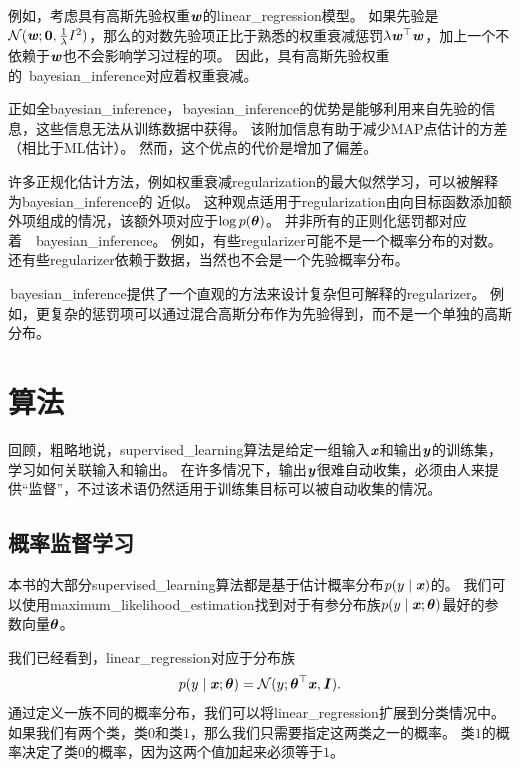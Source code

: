 
例如，考虑具有高斯先验权重$\boldsymbol{\mathit{w}}$的\gls{linear_regression}模型。
如果先验是$\mathcal{N}(\boldsymbol{\mathit{w}};\mathbf{0},\frac{1}{\lambda}I^2)$，那么的对数先验项正比于熟悉的权重衰减惩罚$\lambda \boldsymbol{\mathit{w}}^\top\boldsymbol{\mathit{w}}$，加上一个不依赖于$\boldsymbol{\mathit{w}}$也不会影响学习过程的项。
因此，具有高斯先验权重的~\gls{bayesian_inference}对应着权重衰减。

正如全\gls{bayesian_inference}，\,\gls{bayesian_inference}的优势是能够利用来自先验的信息，这些信息无法从训练数据中获得。
该附加信息有助于减少\gls{MAP}点估计的方差（相比于ML估计）。
然而，这个优点的代价是增加了偏差。

许多正规化估计方法，例如权重衰减\gls{regularization}的最大似然学习，可以被解释为\gls{bayesian_inference}的\,\,近似。
这种观点适用于\gls{regularization}由向目标函数添加额外项组成的情况，该额外项对应于$\log p(\boldsymbol{\theta})$。
并非所有的正则化惩罚都对应着~~\gls{bayesian_inference}。
例如，有些\gls{regularizer}可能不是一个概率分布的对数。
还有些\gls{regularizer}依赖于数据，当然也不会是一个先验概率分布。

\,\gls{bayesian_inference}提供了一个直观的方法来设计复杂但可解释的\gls{regularizer}。
例如，更复杂的惩罚项可以通过混合高斯分布作为先验得到，而不是一个单独的高斯分布\citep{Nowlan-nips92}。

\section{算法}
\label{sec:supervised_learning_algorithms}
回顾，粗略地说，\gls{supervised_learning}算法是给定一组输入$\boldsymbol{\mathit{x}}$和输出$\boldsymbol{\mathit{y}}$的训练集，学习如何关联输入和输出。
在许多情况下，输出$\boldsymbol{\mathit{y}}$很难自动收集，必须由人来提供``监督''，不过该术语仍然适用于训练集目标可以被自动收集的情况。


\subsection{概率监督学习}
\label{sec:probabilistic_supervised_learning}
本书的大部分\gls{supervised_learning}算法都是基于估计概率分布$p(y\mid\boldsymbol{\mathit{x}})$的。
我们可以使用\gls{maximum_likelihood_estimation}找到对于有参分布族$p(y\mid\boldsymbol{\mathit{x}};\boldsymbol{\theta})$最好的参数向量$\boldsymbol{\theta}$。 

我们已经看到，\gls{linear_regression}对应于分布族
\begin{equation}
    p(y \mid \boldsymbol{\mathit{x}}; \boldsymbol{\theta}) = \mathcal{N}( y; \boldsymbol{\theta}^\top \boldsymbol{\mathit{x}}, \boldsymbol{\mathit{I}}).
\end{equation}
通过定义一族不同的概率分布，我们可以将\gls{linear_regression}扩展到分类情况中。
如果我们有两个类，类$0$和类$1$，那么我们只需要指定这两类之一的概率。
类$1$的概率决定了类$0$的概率，因为这两个值加起来必须等于$1$。

